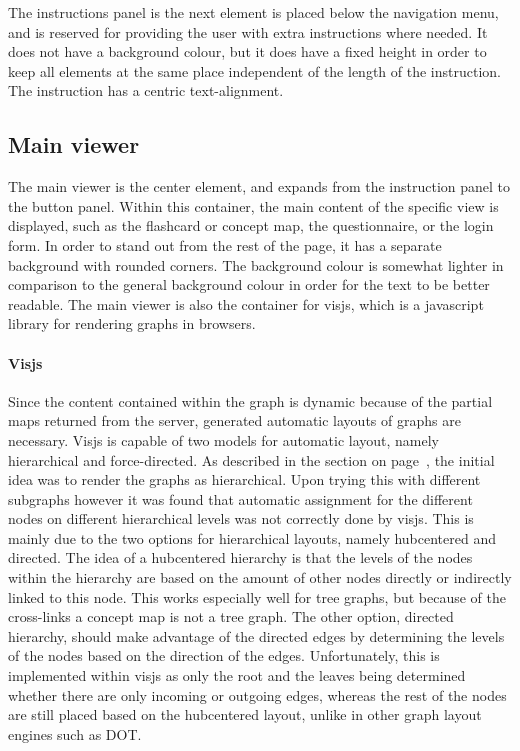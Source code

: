 The instructions panel is the next element is placed below the navigation menu, and is reserved for providing the user with extra instructions where needed. It does not have a background colour, but it does have a fixed height in order to keep all elements at the same place independent of the length of the instruction. The instruction has a centric text-alignment.

\subsection{Main viewer}

The main viewer is the center element, and expands from the instruction panel to the button panel. Within this container, the main content of the specific view is displayed, such as the flashcard or concept map, the questionnaire, or the login form. In order to stand out from the rest of the page, it has a separate background with rounded corners. The background colour is somewhat lighter in comparison to the general background colour in order for the text to be better readable. The main viewer is also the container for visjs, which is a javascript library for rendering graphs in browsers.

\paragraph{Visjs} Since the content contained within the graph is dynamic because of the partial maps returned from the server, generated automatic layouts of graphs are necessary. Visjs is capable of two models for automatic layout, namely hierarchical and force-directed. As described in the  section on page~\pageref{sec:cmapframework}, the initial idea was to render the graphs as hierarchical. Upon trying this with different subgraphs however it was found that automatic assignment for the different nodes on different hierarchical levels was not correctly done by visjs. This is mainly due to the two options for hierarchical layouts, namely hubcentered and directed. The idea of a hubcentered hierarchy is that the levels of the nodes within the hierarchy are based on the amount of other nodes directly or indirectly linked to this node. This works especially well for tree graphs, but because of the cross-links a concept map is not a tree graph. The other option, directed hierarchy, should make advantage of the directed edges by determining the levels of the nodes based on the direction of the edges. Unfortunately, this is implemented within visjs as only the root and the leaves being determined whether there are only incoming or outgoing edges, whereas the rest of the nodes are still placed based on the hubcentered layout, unlike in other graph layout engines such as DOT. 


